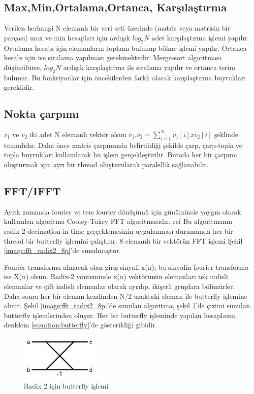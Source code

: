 \subsection{Max,Min,Ortalama,Ortanca, Karşılaştırma}
Verilen herhangi N elemanlı bir veri seti üzerinde (matris veya matrisin bir parçası) max ve min hesapları için ardışık $log_{2}N$ adet karşılaştırma işlemi yapılır. Ortalama hesabı için elemanların toplamı bulunup bölme işlemi yapılır. Ortanca hesabı için ise sıralama yapılması gerekmektedir. Merge-sort algoritması düşünülürse, $log_{2}N$ ardışık karşılaştırma ile sıralama yapılır ve ortanca terim bulunur. Bu fonksiyonlar için öncekilerden farklı olarak karşılaştırma buyrukları gereklidir. 

\subsection{Nokta çarpımı}
$v_{1}$ ve $v_{2}$ iki adet N elemanlı vektör olsun $v_{1} . v_{2} = \sum_{i=1}^{N} v_{1}[i] x v_{2}[i]$ şeklinde tanımlıdır. Daha önce matris çarpımında belirtildiği şekilde çarp, çarp-topla ve topla buyrukları kullanılarak bu işlem gerçekleştirilir. Burada her bir çarpımı oluşturmak için ayrı bir thread oluşturularak paralellik sağlanabilir.

\subsection{FFT/IFFT}
Ayrık zamanda fourier ve ters fourier dönüşümü için günümüzde yaygın olarak kullanılan algoritma Cooley-Tukey FFT algoritmasıdır. ref{} Bu algoritmanın radix-2 decimation in time gerçeklemesinin uygulanması durumunda her bir thread bir butterfly işlemini çalıştırır. 8 elemanlı bir vektörün FFT işlemi Şekil \ref{image:fft_radix2_8p}'de sunulmuştur. \par

Fourier transformu alınacak olan giriş sinyali x(n), bu sinyalin fourier transformu ise X(n) olsun.
Radix-2 yönteminde x(n) vektörünün elemanları tek indisli elemanlar ve çift indisli elemanlar olarak ayrılıp, ikişerli gruplara bölünürler. Daha sonra her bir eleman kendinden N/2 uzaktaki eleman ile butterfly işlemine alınır. Şekil \ref{image:fft_radix2_8p}'de sunulan algoritma, şekil \ref{image:fft_radix2_butterfly}'de çizimi sunulan butterfly işlemlerinden oluşur. Her bir butterfly işleminde yapılan hesaplama denklem \ref{equation:butterfly}'de gösterildiği gibidir.

\begin{figure}[h] \label{image:fft_radix2_butterfly} 
\centering \includegraphics{gorsel/fft_radix2_butterfly.jpg} \caption{Radix 2 için butterfly işlemi}  
\end{figure}


